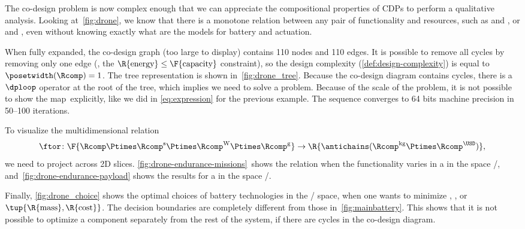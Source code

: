 The co-design problem is now complex enough that we can appreciate the compositional properties of CDPs to perform a qualitative analysis.
Looking at~\cref{fig:drone}, we know that there is a monotone relation between any pair of functionality and resources, such as  and , or  and , even without knowing exactly what are the models for battery and actuation.

When fully expanded, the co-design graph (too large to display) contains 110 nodes and 110 edges.
It is possible to remove all cycles by removing only one edge (\eg, the $\R{\text{energy}}\leq\text{\F{\text{capacity}}}$ constraint), so the design complexity (\cref{def:design-complexity}) is equal to~$\posetwidth(\Rcomp)=1$.
The tree representation is shown in~\cref{fig:drone_tree}.
Because the co-design diagram contains cycles, there is a~$\dploop$ operator at the root of the tree, which implies we need to solve a  problem.
Because of the scale of the problem, it is not possible to show the map~\ftor explicitly, like we did in \cref{eq:expression} for the previous example.
The  sequence converges to 64 bits machine precision in 50--100 iterations.

To visualize the multidimensional relation
\begin{equation}
    \ftor\colon\F{\Rcomp\Ptimes\Rcomp^{\text{s}}\Ptimes\Rcomp^{\text{W}}\Ptimes\Rcomp^{\text{g}}}\rightarrow\R{\antichains(\Rcomp^{\text{kg}}\Ptimes\Rcomp^{\USD})},
\end{equation}
we need to project across 2D slices.
\cref{fig:drone-endurance-missions}~shows the relation when the functionality varies in a  in the space /, and~\cref{fig:drone-endurance-payload} shows the results for a  in the space /.

Finally, \cref{fig:drone_choice} shows the optimal choices of battery technologies in the / space, when one wants to minimize , , or~$\tup{\R{\text{mass}},\R{\text{cost}}} $.
The decision boundaries are completely different from those in~\cref{fig:mainbattery}.
This shows that it is not possible to optimize a component separately from the rest of the system, if there are cycles in the co-design diagram.

